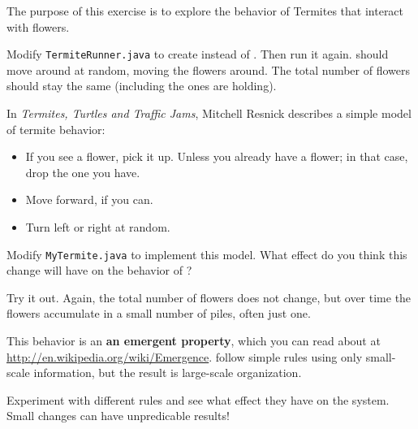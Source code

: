 \begin{exercise}
The purpose of this exercise is to explore the behavior of Termites that interact with flowers.

Modify {\tt TermiteRunner.java} to create  instead of .
Then run it again.
 should move around at random, moving the flowers around.
The total number of flowers should stay the same (including the ones  are holding).

In {\em Termites, Turtles and Traffic Jams}, Mitchell Resnick describes a simple model of termite behavior:

\begin{itemize}

\item If you see a flower, pick it up.
Unless you already have a flower; in that case, drop the one you have.

\item Move forward, if you can.

\item Turn left or right at random.

\end{itemize}

Modify {\tt MyTermite.java} to implement this model.
What effect do you think this change will have on the behavior of ?

Try it out.
Again, the total number of flowers does not change, but over time the flowers accumulate in a small number of piles, often just one.

This behavior is an {\bf an emergent property}, which you can read about at \url{http://en.wikipedia.org/wiki/Emergence}.
 follow simple rules using only small-scale information, but the result is large-scale organization.

Experiment with different rules and see what effect they have on the system.
Small changes can have unpredicable results!

\end{exercise}


